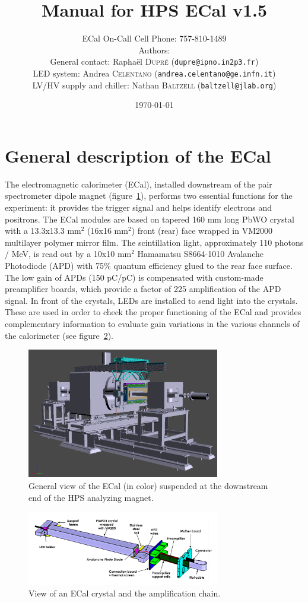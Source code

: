 \documentclass[12pt]{article}
\title{Manual for HPS ECal v1.5}
\author{ECal On-Call Cell Phone: 757-810-1489 \\ 
Authors: \\
General contact: Rapha\"el \textsc{Dupr\'e} (\texttt{dupre@ipno.in2p3.fr})\\ 
LED system: Andrea \textsc{Celentano} (\texttt{andrea.celentano@ge.infn.it})\\
LV/HV supply and chiller: Nathan \textsc{Baltzell} (\texttt{baltzell@jlab.org})\\
}
\date{\today} %
\begin{document}
\maketitle{}

   \section{General description of the ECal}


The electromagnetic calorimeter (ECal), installed downstream of the pair spectrometer dipole magnet (figure~\ref{GView}), performs two essential functions for the experiment: it provides the trigger signal and helps identify electrons and positrons. The ECal modules are based on tapered 160 mm long PbWO crystal with a 13.3x13.3 mm$^2$ (16x16 mm$^2$) front (rear) face wrapped in VM2000 multilayer polymer mirror film. The scintillation light, approximately 110 photons / MeV, is read out by a 10x10 mm$^2$ Hamamatsu S8664-1010 Avalanche Photodiode (APD) with 75\% quantum efficiency glued to the rear face surface. The low gain of APDs (150 pC/pC) is compensated with custom-made preamplifier boards, which provide a factor of 225 amplification of the APD signal. In front of the crystals, LEDs are installed to send light into the crystals. These are used in order to check the proper functioning of the ECal and provides complementary information to evaluate gain variations in the various channels of the calorimeter (see figure~\ref{AmplChain}).

\begin{figure}[hp]
\center
\includegraphics[width=0.75\textwidth]{pics/GView.png}
\caption{\small \label{GView} General view of the ECal (in color) suspended at the downstream end of the HPS analyzing magnet.}
\end{figure}

\begin{figure}[hp]
\center
\includegraphics[width=0.75\textwidth]{pics/CrystalAssembly.png}
\caption{\small \label{AmplChain} View of an ECal crystal and the amplification chain.}
\end{figure}
      
\end{document}
